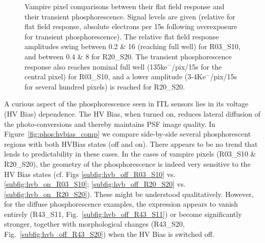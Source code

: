 \begin{figure}[!htbp]
\newline
\caption{Vampire pixel comparisons between their flat field response and their transient phosphorescence. Signal levels are given (relative for flat field response, absolute electrons per 15s following overexposure for transient phosphorescence). The relative flat field response amplitudes swing between 0.2 \& 16 (reaching full well) for R03\_S10, and between 0.4 \& 8 for R20\_S20. The transient phosphorescence response also reaches nominal full well (135ke$^-$/pix/15s for the central pixel) for R03\_S10, and a lower amplitude (3-4Ke$^-$/pix/15s for several hundred pixels) is reached for R20\_S20.}
\label{fig:vamp-phos:R03_S10-R20_S20}
\end{figure}

A curious aspect of the phosphorescence seen in ITL sensors lies in its voltage (HV Bias) dependence. The HV Bias, when turned on, reduces lateral diffusion of the photo-conversions and thereby maintains PSF image quality. In Figure~\ref{fig:phos:hvbias_comp} we compare side-by-side several phosphorescent regions with both HVBias states (off and on). There appears to be no trend that lends to predictability in these cases. In the cases of vampire pixels (R03\_S10 \& R20\_S20), the geometry of the phosphorescence is indeed very sensitive to the HV Bias states (cf. Figs \ref{subfig:hvb_off_R03_S10} vs. \ref{subfig:hvb_on_R03_S10}; \ref{subfig:hvb_off_R20_S20} vs. \ref{subfig:hvb_on_R20_S20}). These might be understood qualitatively. However, for the diffuse phosphorescence examples, the expression appears to vanish entirely (R43\_S11, Fig.~\ref{subfig:hvb_off_R43_S11}) or become significantly stronger, together with morphological changes (R43\_S20, Fig.~\ref{subfig:hvb_off_R43_S20}) when the HV Bias is switched off.


